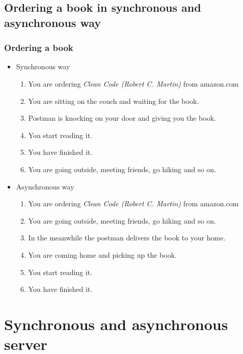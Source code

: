 \documentclass[11pt,t,usepdftitle=false,aspectratio=169,usenames,dvipsnames]{beamer}
\begin{document}
    \subsection{Ordering a book in synchronous and asynchronous way}
    \begin{frame}
        \frametitle{Ordering a book}
        \begin{itemize}
            \item<1-> Synchronous way
            \begin{enumerate}
                \item<2-> You are ordering \textit{Clean Code (Robert C. Martin)} from amazon.com
                \item<3-> You are sitting on the couch and waiting for the book.
                \item<4-> Postman is knocking on your door and giving you the book.
                \item<5-> You start reading it.
                \item<6-> You have finished it.
                \item<7-> You are going outside, meeting friends, go hiking and so on.
            \end{enumerate}
            \item<8-> Asynchronous way
            \begin{enumerate}
                \item<9-> You are ordering \textit{Clean Code (Robert C. Martin)} from amazon.com
                \item<10-> You are going outside, meeting friends, go hiking and so on.
                \item<11-> In the meanwhile the postman delivers the book to your home.
                \item<12-> You are coming home and picking up the book.
                \item<13-> You start reading it.
                \item<14-> You have finished it.
            \end{enumerate}
        \end{itemize}
    \end{frame}

    \section{Synchronous and asynchronous server}
\end{document}
